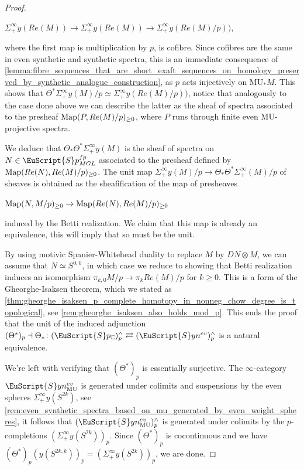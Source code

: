 \documentclass[oneside,a4paper]{amsart}
\newcommand{\euscr}[1]{\EuScript{#1}} %
\newcommand{\Map}{\textnormal{Map}} %
\newcommand{\MU}{\mathrm{MU}} %
\newcommand{\spectra}{\euscr{S}p} %
\newcommand{\cspectra}{\euscr{S}p_{\mathbb{C}}} %
\newcommand{\synspectra}{\euscr{S}yn} %
\newcommand{\pcomplete}{^{\wedge} _{p}} %
\newcommand{\spectramglfp}{\spectra_{MGL}^{fp}} %
\newcommand{\sigmainfty}{\Sigma^{\infty}_{+}} %
\theoremstyle{plain}
\theoremstyle{definition}
\theoremstyle{remark}
\begin{document}
\begin{proof}
\begin{center}
$\sigmainfty y(Re(M)) \rightarrow \sigmainfty y(Re(M)) \rightarrow \sigmainfty y(Re(M)/p))$,
\end{center}
where the first map is multiplication by $p$, is cofibre. Since cofibres are the same in even synthetic and synthetic spectra, this is an immediate consequence of \cref{lemma:fibre_sequences_that_are_short_exaft_sequences_on_homology_preserved_by_synthetic_analogue_construction}, as $p$ acts injectively on $\MU_{*}M$. This shows that $\Theta^{*} \sigmainfty y(M) / p \simeq \sigmainfty y(Re(M)/p))$, notice that analogously to the case done above we can describe the latter as the sheaf of spectra associated to the presheaf $\Map(P, Re(M)/p)_{\geq 0}$, where $P$ runs through finite even $\MU$-projective spectra. 

We deduce that $\Theta_{*} \Theta^{*} \sigmainfty y(M)$ is the sheaf of spectra on $N \in \spectramglfp$ associated to the presheaf defined by $\Map(Re(N), Re(M)/p)_{\geq 0}$. The unit map $\sigmainfty y(M) / p \rightarrow \Theta_{*} \Theta^{*} \sigmainfty (M) / p$ of sheaves is obtained as the sheafification of the map of presheaves 

\begin{center}
$\Map(N, M/p)_{\geq 0} \rightarrow \Map(Re(N), Re(M)/p)_{\geq 0}$
\end{center}
induced by the Betti realization. We claim that this map is already an equivalence, this will imply that so must be the unit. 

By using motivic Spanier-Whitehead duality to replace $M$ by $DN \otimes M$, we can assume that $N \simeq S^{0, 0}$, in which case we reduce to showing that Betti realization induces an isomorphism $\pi_{k, 0} M / p \rightarrow \pi_{k} Re(M) / p$ for $k \geq 0$. This is a form of the Gheorghe-Isaksen theorem, which we stated as \cref{thm:gheorghe_isaksen_p_complete_homotopy_in_nonneg_chow_degree_is_topological}, see
\cref{rem:gheorghe_isaksen_also_holds_mod_p}. This ends the proof that the unit of the induced adjunction $(\Theta^{*})_{p} \dashv \Theta_{*} \colon (\cspectra) \pcomplete \rightleftarrows (\synspectra^{ev}) \pcomplete$ is a natural equivalence. 

We're left with verifying that $(\Theta^{*})_{p}$ is essentially surjective. The $\infty$-category $\synspectra_{\MU}^{ev}$ is generated under colimits and suspensions by the even spheres $\sigmainfty y(S^{2k})$, see \cref{rem:even_synthetic_spectra_based_on_mu_generated_by_even_weight_spheres}, it follows that $(\synspectra_{\MU}^{ev}) \pcomplete$ is generated under colimits by the $p$-completions $(\sigmainfty y(S^{2k})) _{p}$. Since $(\Theta^{*})_{p}$ is cocontinuous and we have $(\Theta^{*})_{p} (y(S^{2k, k})) _{p} = (\sigmainfty y(S^{2k}))_{p}$, we are done. 
\end{proof}
\end{document}
